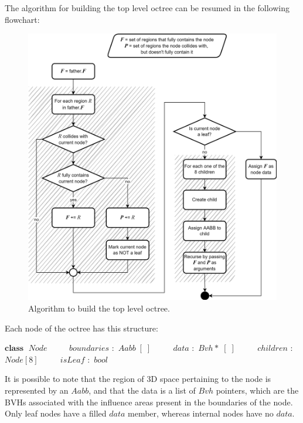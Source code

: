\documentclass{PoliMi_MasterThesis}
\newcommand*\Class[1]{\State $\textbf{class} \;$ #1}
\newcommand*\Member[2]{\State $\qquad$ #1 $:$ #2}
\begin{document}
The algorithm for building the top level octree can be resumed in the following flowchart:

\begin{figure}[H]
	\centering
	\includegraphics[width=\textwidth*\real{0.97}]{Images/octree_build_flowchart.png}
	\caption{Algorithm to build the top level octree.}
	\label{fig:octree_build_flowchart}
\end{figure}

Each node of the octree has this structure:

\begin{algorithm}[H]
	\begin{algorithmic}
		\Class{$Node$}
		\Member{$boundaries$}{$Aabb\;[\;]$}
		\Member{$data$}{$Bvh*\;[\;]$}
		\Member{$children$}{$Node[8]$}
		\Member{$isLeaf$}{$bool$}
	\end{algorithmic}
\end{algorithm} 

It is possible to note that the region of 3D space pertaining to the node is represented by an $Aabb$, and that the data is a list of $Bvh$ pointers, which are the BVHs associated with the influence areas present in the boundaries of the node. Only leaf nodes have a filled $data$ member, whereas internal nodes have no $data$.
\end{document}
